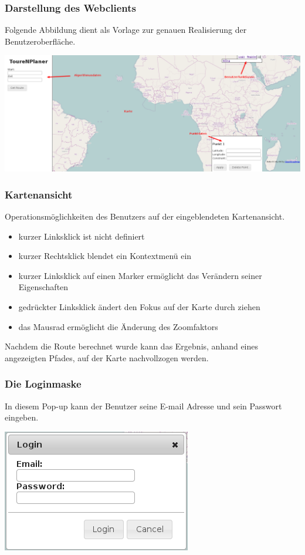 \documentclass[a4paper,10pt,titlepage]{article}
\begin{document}
\subsubsection{Darstellung des Webclients}
Folgende Abbildung dient als Vorlage zur genauen Realisierung der Benutzeroberfläche.

\includegraphics[scale=0.30]{media/web/Index.png} 

\subsubsection{Kartenansicht}
Operationsmöglichkeiten des Benutzers auf der eingeblendeten Kartenansicht.
\begin {itemize}
\item kurzer Linksklick ist nicht definiert
\item kurzer Rechtsklick blendet ein Kontextmenü ein
\item kurzer Linksklick auf einen Marker ermöglicht das Verändern seiner Eigenschaften
\item gedrückter Linksklick ändert den Fokus auf der Karte durch ziehen
\item das Mausrad ermöglicht die Änderung des Zoomfaktors
\end {itemize}
Nachdem die Route berechnet wurde kann das Ergebnis, anhand eines angezeigten Pfades, auf der Karte nachvollzogen werden.

\subsubsection{Die Loginmaske}
In diesem Pop-up kann der Benutzer seine E-mail Adresse und sein Passwort eingeben.
\begin {center}
\includegraphics[scale=0.5]{media/web/Login.png}
\end {center}
\end{document}
